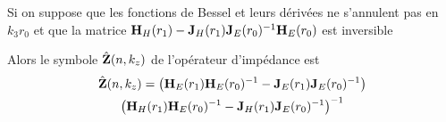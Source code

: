        \begin{thm}
            Si on suppose que les fonctions de Bessel et leurs dérivées ne s’annulent pas en $k_3r_0$ et que 
            la matrice $\mathbf{H}_{H}(r_1) - \mathbf{J}_{H}(r_1)\mathbf{J}_{E}(r_0)^{-1}\mathbf{H}_{E}(r_0)$ est inversible

            Alors le symbole $\hat {\mathbf{Z}}(n,k_z)$ de l'opérateur d'impédance est
            \begin{multline}
                \hat {\mathbf{Z}}(n,k_z) = 
                \left(\mathbf{H}_{E}(r_1)\mathbf{H}_{E}(r_0)^{-1} - \mathbf{J}_{E}(r_1)\mathbf{J}_{E}(r_0)^{-1}\right)\\
                \left(\mathbf{H}_{H}(r_1)\mathbf{H}_{E}(r_0)^{-1} - \mathbf{J}_{H}(r_1)\mathbf{J}_{E}(r_0)^{-1}\right)^{-1}
            \end{multline}
        \end{thm}

